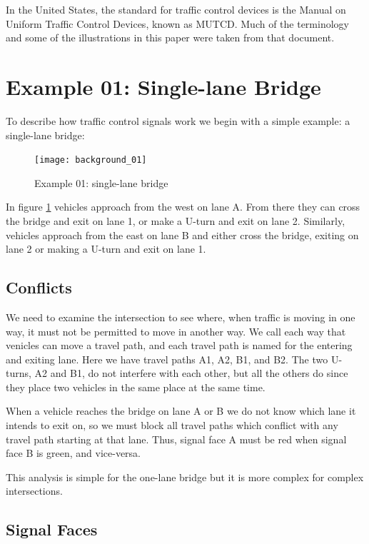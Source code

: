 \documentclass[letterpaper,twoside]{article}
\begin{document}
In the United States, the standard for traffic control devices is the
Manual on Uniform Traffic Control Devices, known as MUTCD\citep{MUTCD11}.
Much of the terminology and some of the illustrations
in this paper were taken from that document.

\section{Example 01: Single-lane Bridge}

To describe how traffic control signals work we begin with a simple
example: a single-lane bridge:

\begin{figure}[htb]
  {\texttt{[image: background\_01]}}
  {\caption{Example 01: single-lane bridge}\label{fig:single-lane_bridge}}
\end{figure}

In figure \ref{fig:single-lane_bridge} vehicles approach from the west
on lane A.  From there they can cross the bridge and exit on lane 1,
or make a U-turn and exit on lane 2.  Similarly, vehicles approach
from the east on lane B and either cross the bridge, exiting on lane 2
or making a U-turn and exit on lane 1.

\subsection{Conflicts}

We need to examine the intersection to see where, when traffic is moving
in one way, it must not be permitted to move in another way.  We call each
way that venicles can move a travel path, and each travel path is named
for the entering and exiting lane.  Here we have travel paths A1, A2, B1,
and B2.  The two U-turns, A2 and B1, do not interfere with each other, but
all the others do since they place two vehicles in the same place at the
same time.

When a vehicle reaches the bridge on lane A or B we do not
know which lane it intends to exit on, so we must block all travel paths
which conflict with any travel path starting at that lane.  Thus,
signal face A must be red when signal face B is green, and vice-versa.

This analysis is simple for the one-lane bridge but it is more complex
for complex intersections.

\subsection{Signal Faces}
\end{document}
